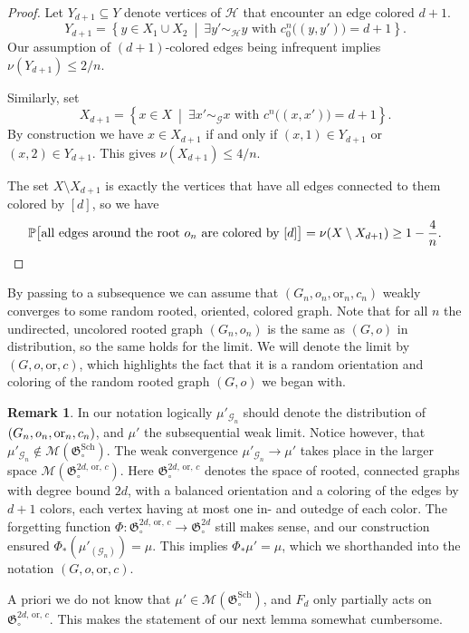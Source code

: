 \documentclass[11pt]{article}
\theoremstyle{definition}
\newtheorem*{rema*}{Remark}
\numberwithin{equation}{section}
\numberwithin{figure}{section}
\numberwithin{table}{section}
\newcommand{\bbP}{\mathbb{P}}
\newcommand{\G}{\mathcal{G}}
\newcommand{\clM}{\mathcal{M}}
\newcommand{\clH}{\mathcal{H}}
\newcommand{\GoG}{\mathfrak{G}}
\newcommand{\orl}{\mathrm{or}}
\DeclareMathOperator{\Sch}{Sch}
\let\oldexists\exists
\renewcommand*{\exists}{\mathrel{\oldexists}}
\begin{document}
\begin{proof}
Let $Y_{d+1}\subseteq Y$ denote vertices of $\clH$ that encounter an edge colored $d+1$.
\[
Y_{d+1}=\left\{y \in X_1 \cup X_2~\middle|~\exists y'\sim_{\clH} y \text{ with } c^n_0\big((y,y')\big)=d+1\right\}.
\]
Our assumption of $(d+1)$-colored edges being infrequent implies $\nu(Y_{d+1}) \leq 2/n$.

Similarly, set
\[
X_{d+1}=\left\{x \in X~\middle|~\exists x'\sim_{\G} x \text{ with } c^n\big((x,x')\big)=d+1\right\}.
\]
By construction we have $x \in X_{d+1}$ if and only if $(x,1) \in Y_{d+1}$ or $(x,2) \in Y_{d+1}$. This gives $\nu(X_{d+1}) \leq 4/n$.

The set $X \setminus X_{d+1}$ is exactly the vertices that have all edges connected to them colored by $[d]$, so we have
\[
\bbP \big[\text{all edges around the root } o_n \text{ are colored by } [d]\big] = \nu(X \setminus X_{d+1}) \geq 1 - \frac{4}{n}.\qedhere
\]
\end{proof}

By passing to a subsequence we can assume that $(G_n,o_n,\orl_n,c_n)$ weakly converges to some random rooted, oriented, colored graph. Note that for all $n$ the undirected, uncolored rooted graph $(G_n,o_n)$ is the same as $(G,o)$ in distribution, so the same holds for the limit. We will denote the limit by $(G,o,\orl, c)$, which highlights the fact that it is a random orientation and coloring of the random rooted graph $(G,o)$ we began with.

\begin{rema*}
In our notation logically $\mu'_{\G_n}$ should denote the distribution of $(G_n,o_n,\linebreak\orl_n,c_n)$, and $\mu'$ the subsequential weak limit. Notice however, that $\mu'_{\G_n} \notin \clM(\GoG^{\Sch}_{\circ})$. The weak convergence $\mu'_{\G_n} \to \mu'$ takes place in the larger space $\clM(\GoG^{2d,\,\orl,\,c}_{\circ})$. Here $\GoG^{2d,\,\orl,\,c}_{\circ}$ denotes the space of rooted, connected graphs with degree bound $2d$, with a balanced orientation and a coloring of the edges by $d+1$ colors, each vertex having at most one in- and outedge of each color. The forgetting function $\Phi: \GoG^{2d,\,\orl,\,c}_{\circ} \to \GoG^{2d}_{\circ}$ still makes sense, and our construction ensured $\Phi_{*}(\mu'_{(\G_n)}) = \mu$. This implies $\Phi_{*} \mu'=\mu$, which we shorthanded into the notation $(G,o,\orl, c)$.

A priori we do not know that $\mu' \in \clM(\GoG^{\Sch}_{\circ})$, and $F_d$ only partially acts on $\GoG^{2d,\,\orl,\,c}_{\circ}$. This makes the statement of our next lemma somewhat cumbersome.
\end{rema*}
\end{document}
